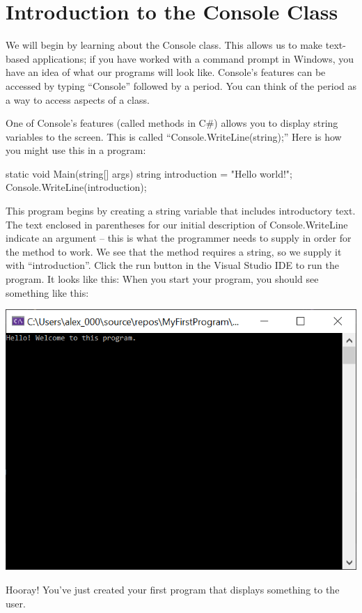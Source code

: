 \documentclass[oneside, openany] {book}
\begin{document}
\section{Introduction to the Console Class}
We will begin by learning about the
Console class. This allows us to make text-based applications; if you have worked with a command prompt in Windows, you have an idea of what our programs will look like. Console’s features can be accessed by typing “Console” followed by a period. You can think of the period as a way to access aspects of a class.

One of Console’s features (called methods in C\#) allows you to display string variables to the screen. This is called “Console.WriteLine(string);” Here is how you might use this in a program:
\begin{CSharp}
static void Main(string[] args)
{
    string introduction = "Hello world!";
    Console.WriteLine(introduction);        
}
\end{CSharp}
This program begins by creating a string variable that includes introductory text. The text enclosed in parentheses for our initial description of Console.WriteLine indicate an argument – this is what the programmer needs to supply in order for the method to work. We see that the method requires a string, so we supply it with “introduction”. 
Click the run button in the Visual Studio IDE to run the program. It looks like this: 
When you start your program, you should see something like this:

\includegraphics[scale = 0.5]{BasicHelloWorld}

Hooray! You’ve just created your first program that displays something to the user.
\end{document}
